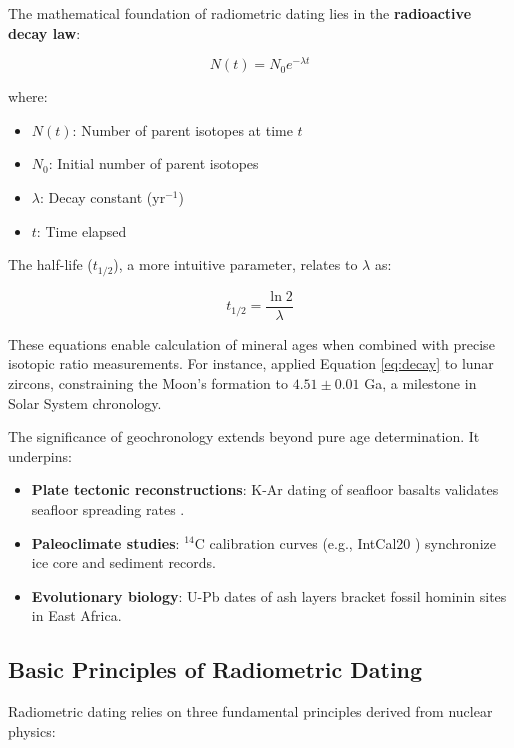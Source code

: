 \documentclass{article}
\begin{document}
The mathematical foundation of radiometric dating lies in the \textbf{radioactive decay law}:

\begin{equation}
    N(t) = N_0 e^{-\lambda t}
    \label{eq:decay}
\end{equation}

where:
\begin{itemize}
    \item \( N(t) \): Number of parent isotopes at time \( t \)
    \item \( N_0 \): Initial number of parent isotopes
    \item \( \lambda \): Decay constant (\( \text{yr}^{-1} \))
    \item \( t \): Time elapsed
\end{itemize}

The half-life (\( t_{1/2} \)), a more intuitive parameter, relates to \( \lambda \) as:

\begin{equation}
    t_{1/2} = \frac{\ln 2}{\lambda}
    \label{eq:half-life}
\end{equation}

These equations enable calculation of mineral ages when combined with precise isotopic ratio measurements. For instance, \cite{Allegre1995} applied Equation \eqref{eq:decay} to lunar zircons, constraining the Moon's formation to \( 4.51 \pm 0.01 \) Ga, a milestone in Solar System chronology.

The significance of geochronology extends beyond pure age determination. It underpins:
\begin{itemize}
    \item \textbf{Plate tectonic reconstructions}: K-Ar dating of seafloor basalts validates seafloor spreading rates \cite{René2018}.
    \item \textbf{Paleoclimate studies}: \(^{14}\text{C}\) calibration curves (e.g., IntCal20 \cite{Reimer2020}) synchronize ice core and sediment records.
    \item \textbf{Evolutionary biology}: U-Pb dates of ash layers bracket fossil hominin sites in East Africa.
\end{itemize}

\subsection{Basic Principles of Radiometric Dating}
\label{subsec:principles}

Radiometric dating relies on three fundamental principles derived from nuclear physics:
\end{document}
